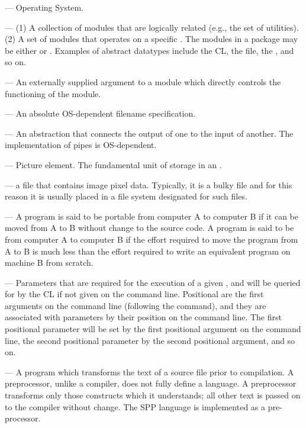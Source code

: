 \medskip \noindent {} --- Operating System.

\medskip \noindent {} --- (1) A collection of modules that 
are logically related (e.g., the set of  utilities).
(2) A set of modules that operates on
a specific . The modules in a package may be
either  or .
Examples of abstract datatypes include the CL, the file,
the , and so on.

\medskip \noindent {} --- An externally supplied 
argument to a module which directly controls the functioning of the module.

\medskip \noindent {} --- An absolute OS-dependent filename
specification.

\medskip \noindent {} --- An abstraction that connects the output
of one  to the input of another. The implementation of pipes
is OS-dependent.

\medskip \noindent {} --- Picture element. The fundamental unit
of storage in an .

\medskip \noindent {} --- a file that contains image
pixel data. Typically, it is a bulky file and for this reason it is usually
placed in a file system designated for such files.

\medskip \noindent {} --- A program is said to be portable
from computer A to computer B if it can be moved from A to B without change
to the source code.
A program is said to be  from computer A to computer B
if the effort required to move the program from A to B is much less than the
effort required to write an equivalent program on machine B from scratch.

\medskip \noindent {} --- Parameters
that are required for the execution of a given ,
and will be queried for by the CL if not given on the command line. Positional
 are the first arguments on the command line (following
the command), and they are associated with parameters by their position
on the command line. The first positional parameter will be set by the first
positional argument on the command line, the second positional parameter by
the second positional argument, and so on.

\medskip \noindent {} --- A program which transforms the
text of a source file prior to compilation.  A preprocessor, unlike a compiler,
does not fully define a language.  A preprocessor transforms only those
constructs which it understands; all other text is passed on to the compiler
without change.  The SPP language is implemented as a pre-processor.

